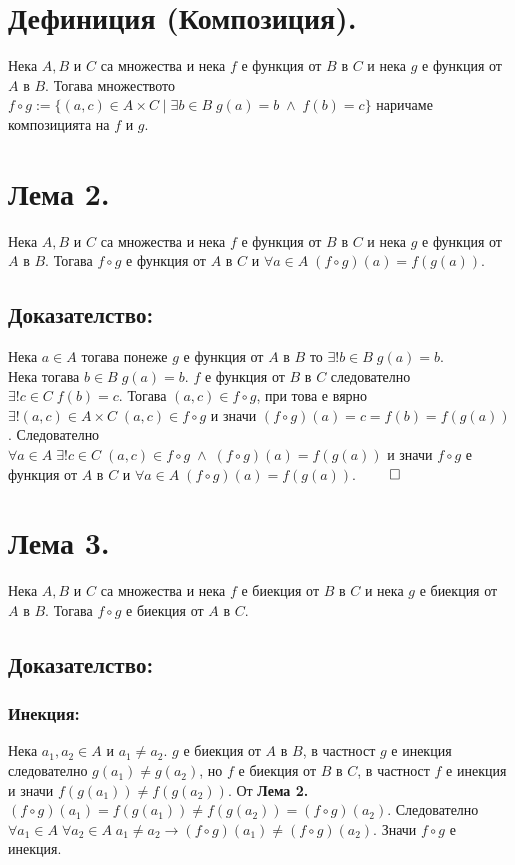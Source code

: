 \documentclass[a4paper, 12pt, oneside]{article}
\begin{document}
\section*{Дефиниция (Композиция).}
Нека \(A, B\) и \(C\) са множества
и нека \(f\) е функция от \(B\) в \(C\)
и нека \(g\) е функция от \(A\) в \(B\).
Тогава множеството \(f \circ g := \{(a, c) \in A \times C \; | \; \exists b \in B \; g(a) = b \; \land \; f(b) = c\}\)
наричаме композицията на \(f\) и \(g\).
\section*{Лема 2.}
Нека \(A, B\) и \(C\) са множества
и нека \(f\) е функция от \(B\) в \(C\)
и нека \(g\) е функция от \(A\) в \(B\).
Тогава \(f \circ g\) е функция от \(A\) в \(C\) и \(\forall a \in A \; (f \circ g)(a) = f(g(a))\).
\subsection*{Доказателство:}
Нека \(a \in A\) тогава понеже \(g\) е функция от \(A\) в \(B\)
то \(\exists! b \in B \; g(a) = b\). \\
Нека тогава \(b \in B \; g(a) = b\).
\(f\) е функция от \(B\) в \(C\) следователно \(\exists! c \in C \; f(b) = c\).
Тогава \((a, c) \in f \circ g\),
при това е вярно \(\exists! (a, c) \in A \times C \; (a, c) \in f \circ g\)
и значи \((f \circ g)(a) = c = f(b) = f(g(a))\).
Следователно \\
\(\forall a \in A \; \exists! c \in C \; (a, c) \in f \circ g \; \land \; (f \circ g)(a) = f(g(a))\)
и значи \(f \circ g\) е функция от \(A\) в \(C\) и \(\forall a \in A \; (f \circ g)(a) = f(g(a))\). \(\qed\)
\section*{Лема 3.}
Нека \(A, B\) и \(C\) са множества
и нека \(f\) е биекция от \(B\) в \(C\)
и нека \(g\) е биекция от \(A\) в \(B\).
Тогава \(f \circ g\) е биекция от \(A\) в \(C\).
\subsection*{Доказателство:}
\subsubsection*{Инекция:}
Нека \(a_1, a_2 \in A\) и \(a_1 \neq a_2\).
\(g\) е биекция от \(A\) в \(B\), в частност \(g\) е инекция
следователно \(g(a_1) \neq g(a_2)\), но \(f\) е биекция от \(B\) в \(C\),
в частност \(f\) е инекция и значи \(f(g(a_1)) \neq f(g(a_2))\).
От \textbf{Лема 2.} \((f \circ g)(a_1) = f(g(a_1)) \neq f(g(a_2)) = (f \circ g)(a_2)\).
Следователно \(\forall a_1 \in A \; \forall a_2 \in A \; a_1 \neq a_2 \longrightarrow (f \circ g)(a_1) \neq (f \circ g)(a_2)\).
Значи \(f \circ g\) е инекция.
\end{document}
